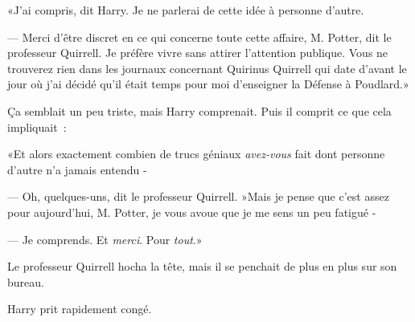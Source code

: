 «J'ai compris, dit Harry. Je ne parlerai de cette idée à personne d'autre.

--- Merci d'être discret en ce qui concerne toute cette affaire, M. Potter, dit le professeur Quirrell. Je préfère vivre sans attirer l'attention publique. Vous ne trouverez rien dans les journaux concernant Quirinus Quirrell qui date d'avant le jour où j'ai décidé qu'il était temps pour moi d'enseigner la Défense à Poudlard.»

Ça semblait un peu triste, mais Harry comprenait. Puis il comprit ce que cela impliquait~:

«Et alors exactement combien de trucs géniaux \emph{avez-vous} fait dont personne d'autre n'a jamais entendu -

--- Oh, quelques-uns, dit le professeur Quirrell. »Mais je pense que c'est assez pour aujourd'hui, M. Potter, je vous avoue que je me sens un peu fatigué -

--- Je comprends. Et \emph{merci}. Pour \emph{tout}.»

Le professeur Quirrell hocha la tête, mais il se penchait de plus en plus sur son bureau.

Harry prit rapidement congé.~ 

